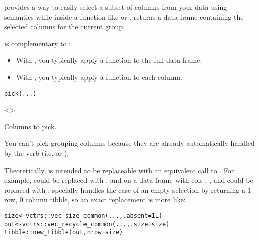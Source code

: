 \documentclass[a4paper]{book}
\begin{document}
%
\begin{Description}
 provides a way to easily select a subset of columns from your data
using  semantics while inside a
 function like  or
.  returns a data frame containing the selected columns
for the current group.

 is complementary to :
\begin{itemize}

\item{} With , you typically apply a function to the full data frame.
\item{} With , you typically apply a function to each column.

\end{itemize}

\end{Description}
%
\begin{Usage}
\begin{verbatim}
pick(...)
\end{verbatim}
\end{Usage}
%
\begin{Arguments}
\begin{ldescription}
\item[\code{...}] <>

Columns to pick.

You can't pick grouping columns because they are already automatically
handled by the verb (i.e.  or ).
\end{ldescription}
\end{Arguments}
%
\begin{Details}
Theoretically,  is intended to be replaceable with an equivalent call
to . For example,  could be replaced with
, and  on a data frame with cols
, , and  could be replaced with .
 specially handles the case of an empty selection by returning a 1
row, 0 column tibble, so an exact replacement is more like:

\begin{alltt}size <- vctrs::vec_size_common(..., .absent = 1L)
out <- vctrs::vec_recycle_common(..., .size = size)
tibble::new_tibble(out, nrow = size)
\end{alltt}

\end{Details}
\end{document}
